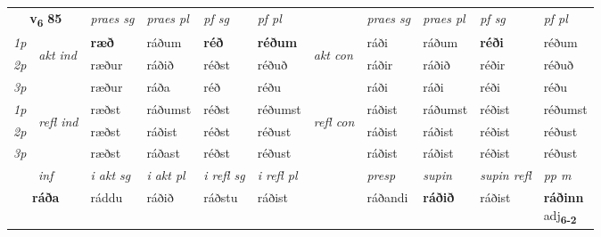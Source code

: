 \noindent
\begin{tabular}{lllllllllll} \toprule
\multicolumn{2}{c}{\textbf{v{\textsubscript{6}}} \Large{\textbf{85}}}  &  \textit{praes sg}  & \textit{praes pl}  &\textit{ pf sg} & \textit{pf pl} &  &  \textit{praes sg}  & \textit{praes pl}  & \textit{pf sg} & \textit{pf pl } \\*
	\cmidrule{3-6} \cmidrule{8-11}
 {\textit{1p}} & \multirow{3}{*}{\begin{turn}{90}\textit{akt ind}\end{turn}} & \textbf{ræð} & ráðum & \textbf{réð} & \textbf{réðum} & \multirow{3}{*}{\begin{turn}{90}\textit{akt con}\end{turn}} &ráði & ráðum & \textbf{réði} & réðum\\*
 {\textit{2p}} &  &  ræður  & ráðið & réðst & réðuð & & ráðir & ráðið & réðir & réðuð \\*
{\textit{3p}} &  & ræður & ráða & réð & réðu & & ráði & ráði& réði & réðu \\*
\cmidrule{3-6} \cmidrule{8-11}
 {\textit{1p}} & \multirow{3}{*}{\begin{turn}{90}\textit{refl ind}\end{turn}}  & ræðst & ráðumst & réðst & réðumst & \multirow{3}{*}{\begin{turn}{90}\textit{refl con}\end{turn}}  &ráðist & ráðumst & réðist & réðumst \\*
 {\textit{2p}} &  & ræðst & ráðist & réðst & réðust & &ráðist & ráðist & réðist & réðust \\*
 {\textit{3p}}  & & ræðst & ráðast & réðst & réðust & & ráðist & ráðist& réðist & réðust \\*
\cmidrule{3-6} \cmidrule{8-11}

   \multicolumn{2}{c}{\textit{inf}}  & \textit{i akt sg} & \textit{i akt pl} & \textit{i refl sg} & \textit{i refl pl} && \textit{presp} & \textit{supin} & \textit{supin refl} & \textit{pp m} \\*
  \multicolumn{2}{c}{\textbf{ráða}} & ráddu  & ráðið & ráðstu & ráðist && ráðandi &  \textbf{ráðið} & ráðist & \specialcell{\textbf{ráðinn} \\ adj\textbf{\textsubscript{6-2}}} \\*
\end{tabular}

